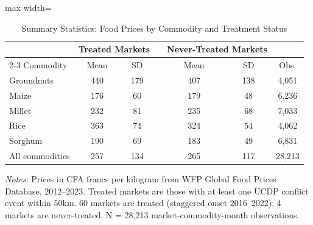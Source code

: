 \begin{table}[H]
\centering
\caption{Summary Statistics: Food Prices by Commodity and Treatment Status}
\label{tab:summary}
\begin{threeparttable}
\begin{adjustbox}{max width=\textwidth}
\begin{tabular}{lcccccc}
\toprule
 & \multicolumn{2}{c}{Treated Markets} & & \multicolumn{2}{c}{Never-Treated Markets} & \\
\cmidrule{2-3} \cmidrule{5-6}
Commodity & Mean & SD & & Mean & SD & Obs. \\
\midrule
Groundnuts & 440 & 179 & & 407 & 138 & 4,051 \\
Maize & 176 & 60 & & 179 & 48 & 6,236 \\
Millet & 232 & 81 & & 235 & 68 & 7,033 \\
Rice & 363 & 74 & & 324 & 54 & 4,062 \\
Sorghum & 190 & 69 & & 183 & 49 & 6,831 \\
\midrule
All commodities & 257 & 134 & & 265 & 117 & 28,213 \\
\bottomrule
\end{tabular}
\end{adjustbox}
\begin{tablenotes}[flushleft]
\small
\item \textit{Notes:} Prices in CFA francs per kilogram from WFP Global Food Prices Database, 2012--2023. Treated markets are those with at least one UCDP conflict event within 50km. 60 markets are treated (staggered onset 2016--2022); 4 markets are never-treated. N = 28,213 market-commodity-month observations.
\end{tablenotes}
\end{threeparttable}
\end{table}
